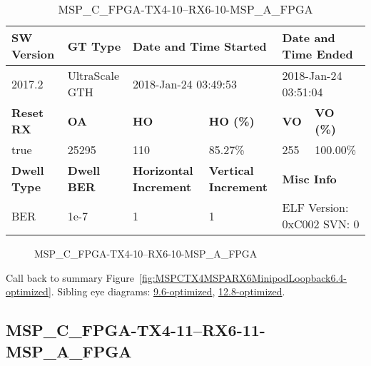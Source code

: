 \begin{table}[h]
\centering
\caption{MSP\_C\_FPGA-TX4-10--RX6-10-MSP\_A\_FPGA}
\label{tab:MSPCFPGATX410RX610MSPAFPGA6.4-optimized}
\begin{tabular}{@{}|l|l|l|l|l|l|@{}}
\toprule
\textbf{SW Version}                & \textbf{GT Type}   & \multicolumn{2}{l|}{\textbf{Date and Time Started}}            & \multicolumn{2}{l|}{\textbf{Date and Time Ended}}        \\ \midrule
2017.2                       & UltraScale GTH          & \multicolumn{2}{l|}{2018-Jan-24 03:49:53}                   & \multicolumn{2}{l|}{2018-Jan-24 03:51:04}               \\ \midrule
\textbf{Reset RX}                  & \textbf{OA} & \textbf{HO}   & \textbf{HO (\%)} & \textbf{VO} & \textbf{VO (\%)} \\ \midrule
true & 25295        & 110          & 85.27\%        & 255        & 100.00\%       \\ \midrule
\textbf{Dwell Type}                & \textbf{Dwell BER} & \textbf{Horizontal Increment} & \textbf{Vertical Increment}    & \multicolumn{2}{l|}{\textbf{Misc Info}}                  \\ \midrule
BER                            & 1e-7        & 1        & 1           & \multicolumn{2}{l|}{ELF Version: 0xC002 SVN: 0}                         \\ \bottomrule
\end{tabular}
\end{table}

\begin{figure}[h]
\caption{MSP\_C\_FPGA-TX4-10--RX6-10-MSP\_A\_FPGA} \label{fig:MSPCFPGATX410RX610MSPAFPGA6.4-optimized}
\end{figure}

Call back to summary Figure~\ref{fig:MSPCTX4MSPARX6MinipodLoopback6.4-optimized}.
Sibling eye diagrams: \hyperref[sec:MSPCFPGATX410RX610MSPAFPGA9.6-optimized]{9.6-optimized}, \hyperref[sec:MSPCFPGATX410RX610MSPAFPGA12.8-optimized]{12.8-optimized}.

\clearpage
\newpage


\subsection{MSP\_C\_FPGA-TX4-11--RX6-11-MSP\_A\_FPGA}\label{sec:MSPCFPGATX411RX611MSPAFPGA6.4-optimized}

